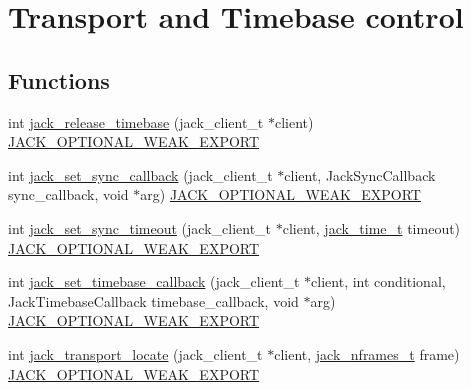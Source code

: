 \hypertarget{group__TransportControl}{\section{\-Transport and \-Timebase control}
\label{d3/dd7/group__TransportControl}
}
\subsection*{\-Functions}
\begin{DoxyCompactItemize}
\item 
int \hyperlink{group__TransportControl_gaea06ff63b129ec6266b2b805b6c8216a}{jack\-\_\-release\-\_\-timebase} (jack\-\_\-client\-\_\-t $\ast$client) \hyperlink{weakmacros_8h_adf1bde0dd996bbf61a44311165014dd1}{\-J\-A\-C\-K\-\_\-\-O\-P\-T\-I\-O\-N\-A\-L\-\_\-\-W\-E\-A\-K\-\_\-\-E\-X\-P\-O\-R\-T}
\item 
int \hyperlink{group__TransportControl_gae53f7ac54804d2896d51b6ad599fa93c}{jack\-\_\-set\-\_\-sync\-\_\-callback} (jack\-\_\-client\-\_\-t $\ast$client, \-Jack\-Sync\-Callback sync\-\_\-callback, void $\ast$arg) \hyperlink{weakmacros_8h_adf1bde0dd996bbf61a44311165014dd1}{\-J\-A\-C\-K\-\_\-\-O\-P\-T\-I\-O\-N\-A\-L\-\_\-\-W\-E\-A\-K\-\_\-\-E\-X\-P\-O\-R\-T}
\item 
int \hyperlink{group__TransportControl_ga2e89b0bb8702d34bcbbe1eac70685ab2}{jack\-\_\-set\-\_\-sync\-\_\-timeout} (jack\-\_\-client\-\_\-t $\ast$client, \hyperlink{types_8h_af9a29b8728e95cc38e2932c0ef855b7e}{jack\-\_\-time\-\_\-t} timeout) \hyperlink{weakmacros_8h_adf1bde0dd996bbf61a44311165014dd1}{\-J\-A\-C\-K\-\_\-\-O\-P\-T\-I\-O\-N\-A\-L\-\_\-\-W\-E\-A\-K\-\_\-\-E\-X\-P\-O\-R\-T}
\item 
int \hyperlink{group__TransportControl_ga0c2f2f464f6ba1c0b2aa45e6507b7aa9}{jack\-\_\-set\-\_\-timebase\-\_\-callback} (jack\-\_\-client\-\_\-t $\ast$client, int conditional, \-Jack\-Timebase\-Callback timebase\-\_\-callback, void $\ast$arg) \hyperlink{weakmacros_8h_adf1bde0dd996bbf61a44311165014dd1}{\-J\-A\-C\-K\-\_\-\-O\-P\-T\-I\-O\-N\-A\-L\-\_\-\-W\-E\-A\-K\-\_\-\-E\-X\-P\-O\-R\-T}
\item 
int \hyperlink{group__TransportControl_gab3f52a42084aead87fd1ee75ed25b240}{jack\-\_\-transport\-\_\-locate} (jack\-\_\-client\-\_\-t $\ast$client, \hyperlink{types_8h_aa954df532e901ae5172e68a23f3da9b6}{jack\-\_\-nframes\-\_\-t} frame) \hyperlink{weakmacros_8h_adf1bde0dd996bbf61a44311165014dd1}{\-J\-A\-C\-K\-\_\-\-O\-P\-T\-I\-O\-N\-A\-L\-\_\-\-W\-E\-A\-K\-\_\-\-E\-X\-P\-O\-R\-T}

\end{DoxyCompactItemize}
